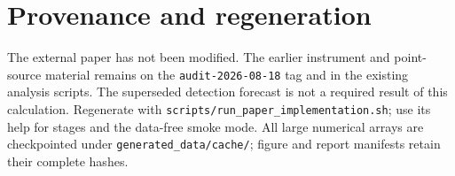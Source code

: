 \documentclass[10pt,letterpaper]{article}
\begin{document}
\section{Provenance and regeneration}



The external paper has not been modified. The earlier instrument and
point-source material remains on the \texttt{audit-2026-08-18} tag and in the
existing analysis scripts. The superseded detection forecast is not a
required result of this calculation. Regenerate with
\nolinkurl{scripts/run_paper_implementation.sh}; use its help for stages
and the data-free smoke mode. All large numerical arrays are checkpointed
under \nolinkurl{generated_data/cache/}; figure and report manifests retain
their complete hashes.
\end{document}
